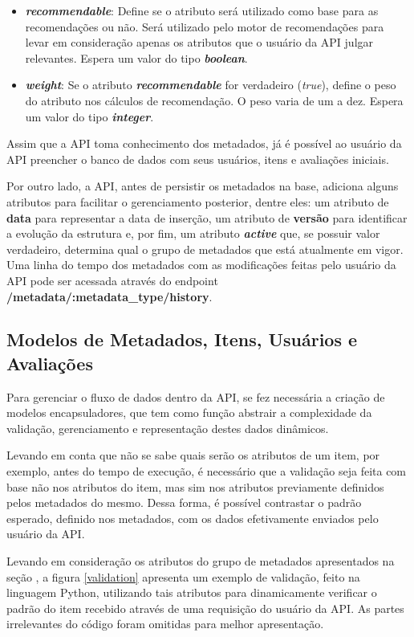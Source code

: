 \documentclass[12pt, openright, oneside, a4paper, brazil]{abntex2}
\begin{document}
\begin{itemize}
	\item \textbf{\textit{recommendable}}: Define se o atributo será utilizado como base para as recomendações ou não. Será utilizado pelo motor de recomendações para levar em consideração apenas os atributos que o usuário da API julgar relevantes. Espera um valor do tipo \textbf{\textit{boolean}}.

	\item \textbf{\textit{weight}}: Se o atributo \textbf{\textit{recommendable}} for verdadeiro (\textit{true}), define o peso do atributo nos cálculos de recomendação. O peso varia de um a dez. Espera um valor do tipo \textbf{\textit{integer}}.
\end{itemize}

Assim que a API toma conhecimento dos metadados, já é possível ao usuário da API preencher o banco de dados com seus usuários, itens e avaliações iniciais.

Por outro lado, a API, antes de persistir os metadados na base, adiciona alguns atributos para facilitar o gerenciamento posterior, dentre eles: um atributo de \textbf{data} para representar a data de inserção, um atributo de \textbf{versão} para identificar a evolução da estrutura e, por fim, um atributo \textbf{\textit{active}} que, se possuir valor verdadeiro, determina qual o grupo de metadados que está atualmente em vigor. Uma linha do tempo dos metadados com as modificações feitas pelo usuário da API pode ser acessada através do endpoint \textbf{/metadata/:metadata\_type/history}.

\subsection{Modelos de Metadados, Itens, Usuários e Avaliações} \label{analisador:modelos}

Para gerenciar o fluxo de dados dentro da API, se fez necessária a criação de modelos encapsuladores, que tem como função abstrair a complexidade da validação, gerenciamento e representação destes dados dinâmicos.

Levando em conta que não se sabe quais serão os atributos de um item, por exemplo, antes do tempo de execução, é necessário que a validação seja feita com base não nos atributos do item, mas sim nos atributos previamente definidos pelos metadados do mesmo. Dessa forma, é possível contrastar o padrão esperado, definido nos metadados, com os dados efetivamente enviados pelo usuário da API.

Levando em consideração os atributos do grupo de metadados apresentados na seção , a figura \ref{validation} apresenta um exemplo de validação, feito na linguagem Python, utilizando tais atributos para dinamicamente verificar o padrão do item recebido através de uma requisição do usuário da API. As partes irrelevantes do código foram omitidas para melhor apresentação.
\end{document}
